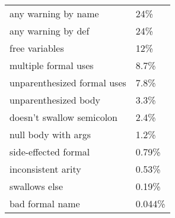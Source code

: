 \begin{tabular}{|l|l|} \hline
any warning by name & 24\% \\ 
any warning by def & 24\% \\ 
free variables & 12\% \\ 
multiple formal uses & 8.7\% \\ 
unparenthesized formal uses & 7.8\% \\ 
unparenthesized body & 3.3\% \\ 
doesn't swallow semicolon & 2.4\% \\ 
null body with args & 1.2\% \\ 
side-effected formal & 0.79\% \\ 
inconsistent arity & 0.53\% \\ 
swallows else & 0.19\% \\
bad formal name & 0.044\% \\ 
\hline
\end{tabular}

